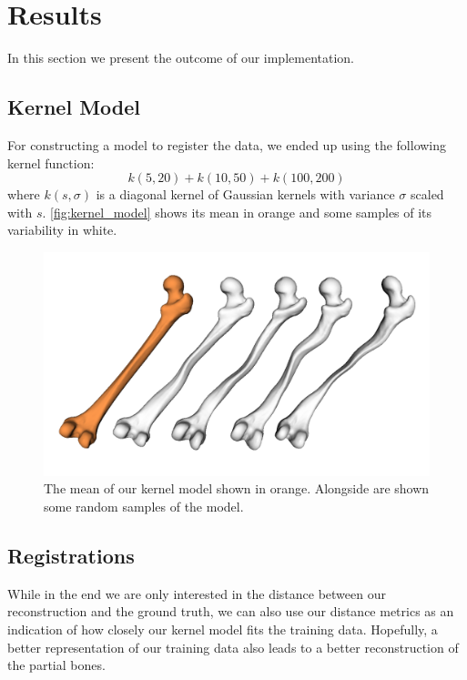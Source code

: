 \section{Results}
\label{sec:results}

In this section we present the outcome of our implementation.


\subsection{Kernel Model}
\label{subsec:kernmodel}

For constructing a model to register the data, we ended up using the following kernel function: 
$$ k(5, 20) + k(10, 50) + k(100, 200) $$
where $k(s, \sigma)$ is a diagonal kernel of Gaussian kernels with variance $\sigma$ scaled with $s$. 
\autoref{fig:kernel_model} shows its mean in orange and some samples of its variability in white.

\begin{figure}
	\centering
  \includegraphics[width=\columnwidth]{./Figures/kernel_model_samples}
  \caption{
    The mean of our kernel model shown in orange. 
    Alongside are shown some random samples of the model.}
  \label{fig:kernel_model}
\end{figure}


\subsection{Registrations}
\label{subsec:registrresults}
While in the end we are only interested in the distance between our reconstruction and the ground truth, we can also use our distance metrics as an indication of how closely our kernel model fits the training data. 
Hopefully, a better representation of our training data also leads to a better reconstruction of the partial bones. 

